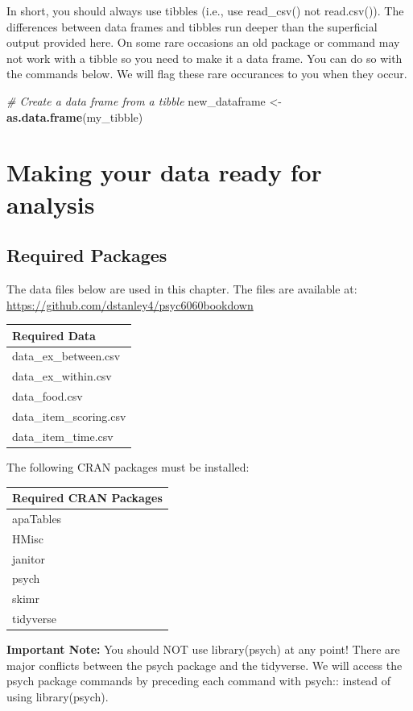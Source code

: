 \documentclass[
]{krantz}
\makeatletter
\newenvironment{Shaded}{\begin{snugshade}}{\end{snugshade}}
\newcommand{\CommentTok}[1]{\textcolor[rgb]{0.37,0.37,0.37}{\textit{#1}}}
\newcommand{\KeywordTok}[1]{\textcolor[rgb]{0.27,0.27,0.27}{\textbf{#1}}}
\newcommand{\NormalTok}[1]{#1}
\newcommand{\StringTok}[1]{\textcolor[rgb]{0.5,0.5,0.5}{#1}}
\newenvironment{kframe}{%
\medskip{}
\setlength{\fboxsep}{.8em}
 \def\at@end@of@kframe{}%
 \ifinner\ifhmode%
  \def\at@end@of@kframe{\end{minipage}}%
  \begin{minipage}{\columnwidth}%
 \fi\fi%
 \def\FrameCommand##1{\hskip\@totalleftmargin \hskip-\fboxsep
 \colorbox{shadecolor}{##1}\hskip-\fboxsep
     \hskip-\linewidth \hskip-\@totalleftmargin \hskip\columnwidth}%
 \MakeFramed {\advance\hsize-\width
   \@totalleftmargin\z@ \linewidth\hsize
   \@setminipage}}%
 {\par\unskip\endMakeFramed%
 \at@end@of@kframe}
\renewenvironment{Shaded}{\begin{kframe}}{\end{kframe}}
\makeatother
\begin{document}
In short, you should always use tibbles (i.e., use read\_csv() not read.csv()). The differences between data frames and tibbles run deeper than the superficial output provided here. On some rare occasions an old package or command may not work with a tibble so you need to make it a data frame. You can do so with the commands below. We will flag these rare occurances to you when they occur.

\begin{Shaded}
\begin{Highlighting}[]
\CommentTok{# Create a data frame from a tibble}
\NormalTok{new_dataframe <-}\StringTok{ }\KeywordTok{as.data.frame}\NormalTok{(my_tibble)}
\end{Highlighting}
\end{Shaded}

\hypertarget{making-your-data-ready-for-analysis}{%
\chapter{Making your data ready for analysis}\label{making-your-data-ready-for-analysis}}

\hypertarget{required-packages}{%
\section{Required Packages}\label{required-packages}}

The data files below are used in this chapter. The files are available at: \url{https://github.com/dstanley4/psyc6060bookdown}

\begin{longtable}[]{@{}l@{}}
\toprule
Required Data\tabularnewline
\midrule
\endhead
data\_ex\_between.csv\tabularnewline
data\_ex\_within.csv\tabularnewline
data\_food.csv\tabularnewline
data\_item\_scoring.csv\tabularnewline
data\_item\_time.csv\tabularnewline
\bottomrule
\end{longtable}

The following CRAN packages must be installed:

\begin{longtable}[]{@{}l@{}}
\toprule
Required CRAN Packages\tabularnewline
\midrule
\endhead
apaTables\tabularnewline
HMisc\tabularnewline
janitor\tabularnewline
psych\tabularnewline
skimr\tabularnewline
tidyverse\tabularnewline
\bottomrule
\end{longtable}

\textbf{Important Note:} You should NOT use library(psych) at any point! There are major conflicts between the psych package and the tidyverse. We will access the psych package commands by preceding each command with psych:: instead of using library(psych).
\end{document}

